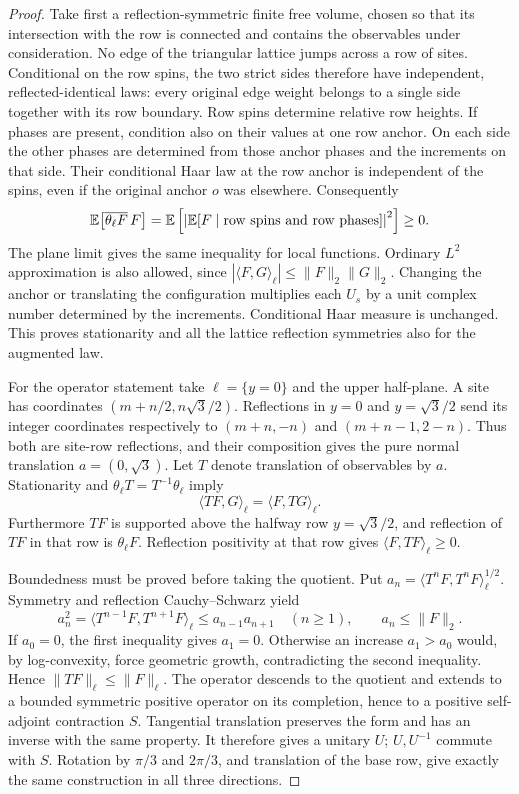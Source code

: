 \begin{proof}
Take first a reflection-symmetric finite free volume, chosen so that its
intersection with the row is connected and contains the observables under
consideration.  No edge of the triangular lattice jumps across a row of
sites.  Conditional on the row spins, the two strict sides therefore have
independent, reflected-identical laws: every original edge weight belongs
to a single side together with its row boundary.  Row spins determine
relative row heights.  If phases are present, condition also on their
values at one row anchor.  On each side the other phases are determined
from those anchor phases and the increments on that side.  Their
conditional Haar law at the row anchor is independent of the spins, even
if the original anchor $o$ was elsewhere.  Consequently
\[
 \mathbb E\big[\overline{\theta_\ell F}\,F\big]
   =\mathbb E\left[\left|\mathbb E[F\mid\text{row spins and row phases}]\right|^2\right]
   \ge0.
\]
The plane limit gives the same inequality for local functions.  Ordinary
$L^2$ approximation is also allowed, since
$|\langle F,G\rangle_\ell|\le\|F\|_2\|G\|_2$.
Changing the anchor or translating the configuration multiplies each
$U_s$ by a unit complex number determined by the increments.  Conditional
Haar measure is unchanged.  This proves stationarity and all the lattice
reflection symmetries also for the augmented law.

For the operator statement take $\ell=\{y=0\}$ and the upper half-plane.
A site has coordinates $(m+n/2,n\sqrt3/2)$.  Reflections in $y=0$ and
$y=\sqrt3/2$ send its integer coordinates respectively to
$(m+n,-n)$ and $(m+n-1,2-n)$.  Thus both are site-row reflections, and their
composition gives the pure normal translation $a=(0,\sqrt3)$.
Let $T$ denote translation of observables by $a$.  Stationarity and
$\theta_\ell T=T^{-1}\theta_\ell$ imply
\[
 \langle TF,G\rangle_\ell=\langle F,TG\rangle_\ell.
\]
Furthermore $TF$ is supported above the halfway row $y=\sqrt3/2$, and
reflection of $TF$ in that row is $\theta_\ell F$.  Reflection positivity
at that row gives $\langle F,TF\rangle_\ell\ge0$.

Boundedness must be proved before taking the quotient.  Put
$a_n=\langle T^nF,T^nF\rangle_\ell^{1/2}$.  Symmetry and reflection
Cauchy--Schwarz yield
\[
 a_n^2=\langle T^{n-1}F,T^{n+1}F\rangle_\ell
       \le a_{n-1}a_{n+1}\quad(n\ge1),
 \qquad a_n\le\|F\|_2.
\]
If $a_0=0$, the first inequality gives $a_1=0$.  Otherwise an increase
$a_1>a_0$ would, by log-convexity, force geometric growth, contradicting
the second inequality.  Hence $\|TF\|_\ell\le\|F\|_\ell$.
The operator descends to the quotient and extends to a bounded symmetric
positive operator on its completion, hence to a positive self-adjoint
contraction $S$.  Tangential translation preserves the form and has an
inverse with the same property.  It therefore gives a unitary $U$;
$U,U^{-1}$ commute with $S$.  Rotation by $\pi/3$ and $2\pi/3$, and
translation of the base row, give exactly the same construction in all
three directions.
\end{proof}

